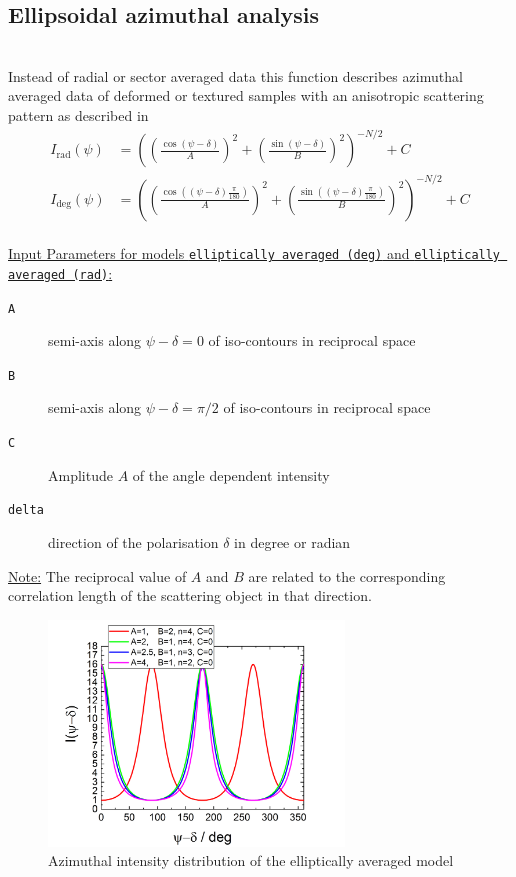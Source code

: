 \subsection{Ellipsoidal azimuthal analysis} ~\\
Instead of radial or sector averaged data this function describes azimuthal averaged data of deformed or textured samples with an anisotropic scattering pattern as described in
\cite{Summerfield1983,Mildner1983,Reynolds1984,Hammouda1986,Hammouda1986a,Saraf1989,Svetogorsky1990,Gu2016,Gu2018}
\begin{align}
I_\mathrm{rad}(\psi) &= \left(\left(\frac{\cos(\psi-\delta)}{A}\right)^2 + \left(\frac{\sin(\psi-\delta)}{B}\right)^2\right)^{-N/2} +C\\
I_\mathrm{deg}(\psi) &= \left(\left(\frac{\cos\left((\psi-\delta)\frac{\pi}{180}\right)}{A}\right)^2 + \left(\frac{\sin\left((\psi-\delta)\frac{\pi}{180}\right)}{B}\right)^2\right)^{-N/2}+C
\end{align}
\hspace{1pt}\\
\underline{Input Parameters for models \texttt{elliptically averaged (deg)} and \texttt{elliptically averaged (rad)}:}\\
\begin{description}
\item[\texttt{A}] semi-axis along $\psi-\delta=0$ of iso-contours in reciprocal space
\item[\texttt{B}] semi-axis along $\psi-\delta=\pi/2$ of iso-contours in reciprocal space
\item[\texttt{C}] Amplitude $A$ of the angle dependent intensity
\item[\texttt{delta}] direction of the polarisation $\delta$ in degree or radian
\end{description}

\underline{Note:}
The reciprocal value of $A$ and $B$ are related to the corresponding correlation length of the scattering object in that direction.


\begin{figure}[htb]
\begin{center}
\includegraphics[width=0.7\textwidth]{../images/form_factor/azimuthal/ellipsoidal.png}
\end{center}
\caption{Azimuthal intensity distribution of the elliptically averaged model}
\label{fig:elliptically_averaged}
\end{figure}
